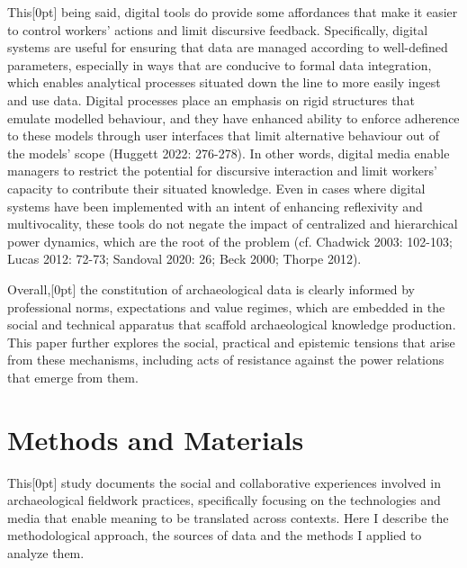\documentclass[
]{article}
\newcommand{\paragraphnumber}[1]{\marginnote{\color{lightgray}\tiny{#1}}[0pt]}
\begin{document}
This\paragraphnumber{[19]} being said, digital tools do provide some
affordances that make it easier to control workers' actions and limit
discursive feedback. Specifically, digital systems are useful for
ensuring that data are managed according to well-defined parameters,
especially in ways that are conducive to formal data integration, which
enables analytical processes situated down the line to more easily
ingest and use data. Digital processes place an emphasis on rigid
structures that emulate modelled behaviour, and they have enhanced
ability to enforce adherence to these models through user interfaces
that limit alternative behaviour out of the models' scope (Huggett 2022:
276-278). In other words, digital media enable managers to restrict the
potential for discursive interaction and limit workers' capacity to
contribute their situated knowledge. Even in cases where digital systems
have been implemented with an intent of enhancing reflexivity and
multivocality, these tools do not negate the impact of centralized and
hierarchical power dynamics, which are the root of the problem (cf.
Chadwick 2003: 102-103; Lucas 2012: 72-73; Sandoval 2020: 26; Beck 2000;
Thorpe 2012).

Overall,\paragraphnumber{[20]} the constitution of archaeological data
is clearly informed by professional norms, expectations and value
regimes, which are embedded in the social and technical apparatus that
scaffold archaeological knowledge production. This paper further
explores the social, practical and epistemic tensions that arise from
these mechanisms, including acts of resistance against the power
relations that emerge from them.

\section{Methods and Materials}\label{methods-and-materials}

This\paragraphnumber{[21]} study documents the social and collaborative
experiences involved in archaeological fieldwork practices, specifically
focusing on the technologies and media that enable meaning to be
translated across contexts. Here I describe the methodological approach,
the sources of data and the methods I applied to analyze them.
\end{document}
